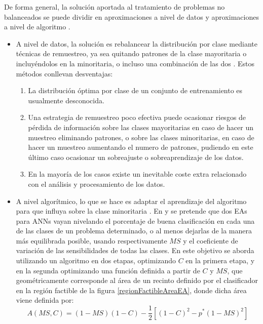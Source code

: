 De forma general, la solución aportada al tratamiento de problemas no balanceados se
puede dividir en aproximaciones a nivel de datos y aproximaciones a nivel de algoritmo
\cite{He2009,Sun2009}.

\begin{itemize}
\item A nivel de datos, la solución es rebalancear la distribución por clase mediante
técnicas
de remuestreo, ya sea quitando patrones de la clase mayoritaria o incluyéndolos en la
minoritaria, o incluso una combinación de las dos \cite{Kubat97,Chawla2002}. Estos métodos
conllevan desventajas:
\begin{enumerate}
\item La distribución óptima por clase de un conjunto de entrenamiento es usualmente
desconocida.
\item Una estrategia de remuestreo poco efectiva
puede ocasionar riesgos de pérdida de información sobre las clases mayoritarias en caso de
hacer un muestreo eliminando patrones, o sobre las clases minoritarias, en caso de hacer
un muestreo aumentando el numero de patrones, pudiendo en este último caso ocasionar un
sobreajuste o sobreaprendizaje de los datos.
\item En la mayoría de los casos existe un inevitable coste extra relacionado con el
análisis y procesamiento de los datos.
\end{enumerate}
\item A nivel algorítmico, lo que se hace es adaptar el aprendizaje del algoritmo
para que influya sobre la clase minoritaria \cite{Jankowski2001b}. En \cite{Fernandez2009}
y \cite{Fernandez2009a} se pretende que dos EAs para ANNs vayan
nivelando el porcentaje de buena clasificación en cada una de las clases de un
problema determinado, o al menos dejarlas de la manera más equilibrada posible, usando
respectivamente $MS$ y el coeficiente de variación de las sensibilidades de
todas las clases. En \cite{Martinez-Estudillo2008} este objetivo se aborda utilizando un
algoritmo en dos etapas, optimizando $C$ en la primera etapa, y en la segunda optimizando
una función definida a partir de $C$ y $MS$, que geométricamente corresponde al área de un
recinto definido por el clasificador en la región factible de la figura
\ref{regionFactibleAreaEA}, donde dicha área viene definida por:
\begin{displaymath}
A(MS,C)=(1-MS)(1-C)-\frac{1}{2}\left[ (1-C)^2-p^*(1-MS)^2\right]
\end{displaymath}
\end{itemize}

